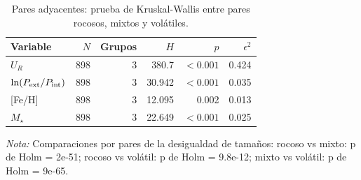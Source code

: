 \begin{table}[htbp]
    \centering
    \caption{Pares adyacentes: prueba de Kruskal-Wallis entre pares rocosos, mixtos y volátiles.}
    \label{tab:C-T5}
    \small
    \begin{tabular}{lrrrrr}
    \toprule
    Variable & $N$ & Grupos & $H$ & $p$ & $\epsilon^2$ \\
    \midrule
    $U_R$ & 898 & 3 & 380.7 & $<0.001$ & 0.424 \\
    $\ln(P_{\rm ext}/P_{\rm int})$ & 898 & 3 & 30.942 & $<0.001$ & 0.035 \\
    {[Fe/H]} & 898 & 3 & 12.095 & 0.002 & 0.013 \\
    $M_\star$ & 898 & 3 & 22.649 & $<0.001$ & 0.025 \\
    \bottomrule
    \end{tabular}
    \par\smallskip
    {\footnotesize\textit{Nota:} Comparaciones por pares de la desigualdad de tamaños: rocoso vs mixto: p de Holm = 2e-51; rocoso vs volátil: p de Holm = 9.8e-12; mixto vs volátil: p de Holm = 9e-65.}
\end{table}
